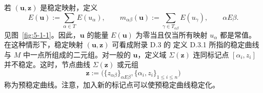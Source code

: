 若 $(\mathbf u,\mathbf z)$ 是稳定映射，定义
\begin{equation}\label{eq:5-1-1}
  E(\mathbf u):=\sum_{\alpha\in T}E(u_\alpha),
  \qquad
  m_{\alpha\beta}(\mathbf u):=
  \sum_{\gamma\in T_{\alpha\beta}}E(u_\gamma),
  \qquad \alpha E\beta.
\end{equation}
见图~\ref{fig:5-1-1}。因此，$\mathbf u$ 的能量 $E(\mathbf u)$ 为零当且仅当所有映射
$u_\alpha$ 都是常值。在这种情形下，稳定映射 $(\mathbf u,\mathbf z)$ 可看成附录 D.3 的
定义 D.3.1 所指的稳定曲线与 $M$ 中一点所组成的二元组。对一般的 $\mathbf u$，定义域
$\Sigma(\mathbf z)$ 连同标记点 $[\alpha_i,z_i]$ 并不稳定。这时，节点曲线
$\Sigma(\mathbf z)$ 或元组
\[
  \mathbf z:=\bigl(\{z_{\alpha\beta}\}_{\alpha E\beta},
  \{\alpha_i,z_i\}_{1\le i\le n}\bigr)
\]
称为预稳定曲线。注意，加入新的标记点可以使预稳定曲线稳定化。

